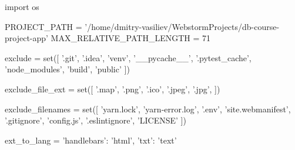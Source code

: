 \begin{pycode}
import os

PROJECT_PATH = '/home/dmitry-vasiliev/WebstormProjects/db-course-project-app'
MAX_RELATIVE_PATH_LENGTH = 71

exclude = set([
    '.git',
    '.idea',
    'venv',
    '__pycache__',
    '.pytest_cache',
    'node_modules',
    'build',
    'public'
])

exclude_file_ext = set([
    '.map',
    '.png',
    '.ico',
    '.jpeg',
    '.jpg',
])

exclude_filenames = set([
    'yarn.lock',
    'yarn-error.log',
    '.env',
    'site.webmanifest',
    '.gitignore',
    'config.js',
    '.eslintignore',
    'LICENSE'
])

ext_to_lang = {
    'handlebars': 'html',
    'txt': 'text'
}
\end{pycode}